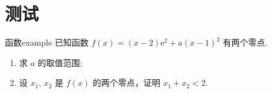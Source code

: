 \documentclass[UTF8]{ctexart}
\begin{document}
\section{测试}

\begin{note}{函数}{example}
已知函数 $ f(x) = (x - 2)\mathrm{e}^{2} + a (x - 1)^{2} $ 有两个零点.
\begin{enumerate}[label=(\arabic*)]
  \item 求 $ a $ 的取值范围;
  \item 设 $ x_{1} $, $ x_{2} $ 是 $ f(x) $ 的两个零点，证明 $ x_{1} + x_{2} < 2 $.
\end{enumerate}
\end{note}
\end{document}
